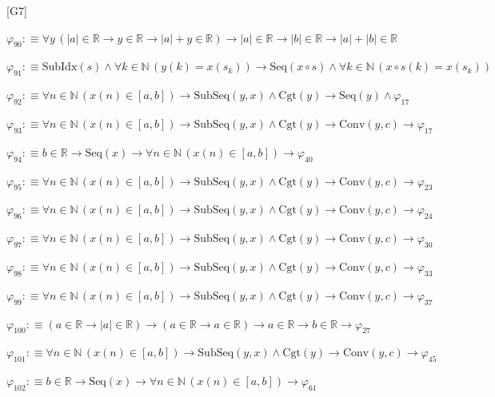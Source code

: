 \begin{fullproof}{[G7]}
\begin{abbrevlist}
\item $\varphi_{90} :\equiv \forall y\,(\lvert a \rvert \in \mathbb{R} \to y \in \mathbb{R} \to \lvert a \rvert + y \in \mathbb{R}) \to \lvert a \rvert \in \mathbb{R} \to \lvert b \rvert \in \mathbb{R} \to \lvert a \rvert + \lvert b \rvert \in \mathbb{R}$
\item $\varphi_{91} :\equiv \mathrm{SubIdx}(s) \land \forall k \in \mathbb{N}\,(y(k) = x(s_{k})) \to \mathrm{Seq}(x \circ s) \land \forall k \in \mathbb{N}\,(x \circ s(k) = x(s_{k}))$
\item $\varphi_{92} :\equiv \forall n \in \mathbb{N}\,(x(n) \in [a,b]) \to \mathrm{SubSeq}(y,x) \land \mathrm{Cgt}(y) \to \mathrm{Seq}(y) \land \varphi_{17}$
\item $\varphi_{93} :\equiv \forall n \in \mathbb{N}\,(x(n) \in [a,b]) \to \mathrm{SubSeq}(y,x) \land \mathrm{Cgt}(y) \to \mathrm{Conv}(y,c) \to \varphi_{17}$
\item $\varphi_{94} :\equiv b \in \mathbb{R} \to \mathrm{Seq}(x) \to \forall n \in \mathbb{N}\,(x(n) \in [a,b]) \to \varphi_{40}$
\item $\varphi_{95} :\equiv \forall n \in \mathbb{N}\,(x(n) \in [a,b]) \to \mathrm{SubSeq}(y,x) \land \mathrm{Cgt}(y) \to \mathrm{Conv}(y,c) \to \varphi_{23}$
\item $\varphi_{96} :\equiv \forall n \in \mathbb{N}\,(x(n) \in [a,b]) \to \mathrm{SubSeq}(y,x) \land \mathrm{Cgt}(y) \to \mathrm{Conv}(y,c) \to \varphi_{24}$
\item $\varphi_{97} :\equiv \forall n \in \mathbb{N}\,(x(n) \in [a,b]) \to \mathrm{SubSeq}(y,x) \land \mathrm{Cgt}(y) \to \mathrm{Conv}(y,c) \to \varphi_{30}$
\item $\varphi_{98} :\equiv \forall n \in \mathbb{N}\,(x(n) \in [a,b]) \to \mathrm{SubSeq}(y,x) \land \mathrm{Cgt}(y) \to \mathrm{Conv}(y,c) \to \varphi_{33}$
\item $\varphi_{99} :\equiv \forall n \in \mathbb{N}\,(x(n) \in [a,b]) \to \mathrm{SubSeq}(y,x) \land \mathrm{Cgt}(y) \to \mathrm{Conv}(y,c) \to \varphi_{37}$
\item $\varphi_{100} :\equiv (a \in \mathbb{R} \to \lvert a \rvert \in \mathbb{R}) \to (a \in \mathbb{R} \to a \in \mathbb{R}) \to a \in \mathbb{R} \to b \in \mathbb{R} \to \varphi_{27}$
\item $\varphi_{101} :\equiv \forall n \in \mathbb{N}\,(x(n) \in [a,b]) \to \mathrm{SubSeq}(y,x) \land \mathrm{Cgt}(y) \to \mathrm{Conv}(y,c) \to \varphi_{45}$
\item $\varphi_{102} :\equiv b \in \mathbb{R} \to \mathrm{Seq}(x) \to \forall n \in \mathbb{N}\,(x(n) \in [a,b]) \to \varphi_{61}$

\end{abbrevlist}
\end{fullproof}
